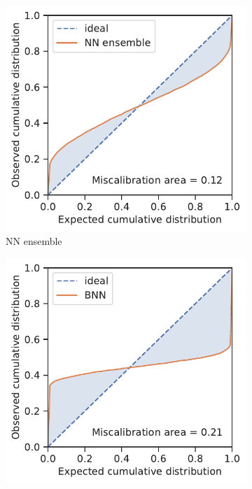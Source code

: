 \documentclass[]{achemso}
\begin{document}
\begin{figure}
    \centering
    \begin{subfigure}{0.32\textwidth}
        \includegraphics[width=\textwidth]{../NN_ensemble/calibration.pdf}
        \caption{\gls{NN} ensemble}\label{fig:calibration_ensemble}
    \end{subfigure}
    \begin{subfigure}{0.32\textwidth}
        \includegraphics[width=\textwidth]{../BNN/calibration.pdf}

\end{subfigure}
\end{figure}
\end{document}
